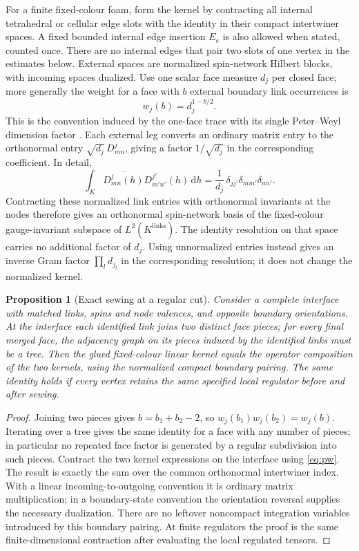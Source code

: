 \documentclass[11pt]{article}
\newtheorem{proposition}[theorem]{Proposition}
\theoremstyle{remark}
\newcommand{\dd}{\mathrm d}
\begin{document}
For a finite fixed-colour foam, form the kernel by contracting all internal tetrahedral or cellular edge slots with the identity in their compact intertwiner spaces. A fixed bounded internal edge insertion \(E_e\) is also allowed when stated, counted once. There are no internal edges that pair two slots of one vertex in the estimates below. External spaces are normalized spin-network Hilbert blocks, with incoming spaces dualized. Use one scalar face measure \(d_j\) per closed face; more generally the weight for a face with \(b\) external boundary link occurrences is
\begin{equation}\label{eq:w}
w_j(b)=d_j^{1-b/2}.
\end{equation}
This is the convention induced by the one-face trace with its single Peter--Weyl dimension factor \cite{BRR}. Each external leg converts an ordinary matrix entry to the orthonormal entry \(\sqrt{d_j}\,D^j_{mn}\), giving a factor \(1/\sqrt{d_j}\) in the corresponding coefficient. In detail,
\begin{equation}\label{eq:pw}
\int_K \overline{D^j_{mn}(h)}D^{j'}_{m'n'}(h)\,\dd h
=\frac{1}{d_j}\,\delta_{jj'}\delta_{mm'}\delta_{nn'}.
\end{equation}
Contracting these normalized link entries with orthonormal invariants at the nodes therefore gives an orthonormal spin-network basis of the fixed-colour gauge-invariant subspace of \(L^2(K^{\mathrm{links}})\). The identity resolution on that space carries no additional factor of \(d_j\). Using unnormalized entries instead gives an inverse Gram factor \(\prod_l d_{j_l}\) in the corresponding resolution; it does not change the normalized kernel.

\begin{proposition}[Exact sewing at a regular cut]\label{pr:sew}
Consider a complete interface with matched links, spins and node valences, and opposite boundary orientations. At the interface each identified link joins two distinct face pieces; for every final merged face, the adjacency graph on its pieces induced by the identified links must be a tree. Then the glued fixed-colour linear kernel equals the operator composition of the two kernels, using the normalized compact boundary pairing. The same identity holds if every vertex retains the same specified local regulator before and after sewing.
\end{proposition}
\begin{proof}
Joining two pieces gives \(b=b_1+b_2-2\), so \(w_j(b_1)w_j(b_2)=w_j(b)\). Iterating over a tree gives the same identity for a face with any number of pieces; in particular no repeated face factor is generated by a regular subdivision into such pieces. Contract the two kernel expressions on the interface using \eqref{eq:pw}. The result is exactly the sum over the common orthonormal intertwiner index. With a linear incoming-to-outgoing convention it is ordinary matrix multiplication; in a boundary-state convention the orientation reversal supplies the necessary dualization. There are no leftover noncompact integration variables introduced by this boundary pairing. At finite regulators the proof is the same finite-dimensional contraction after evaluating the local regulated tensors.
\end{proof}
\end{document}
